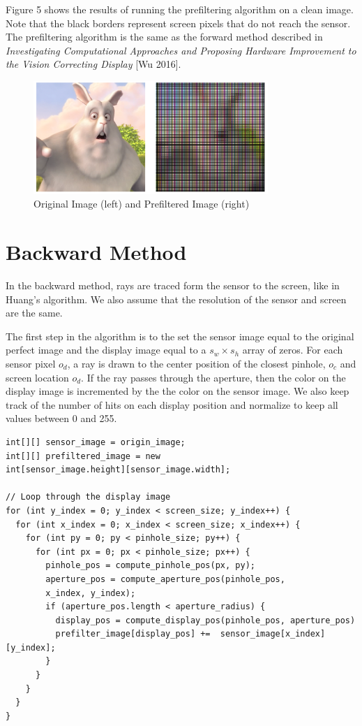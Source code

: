 Figure 5 shows the results of running the prefiltering algorithm on a clean image. Note that the black borders represent screen pixels that do not reach the sensor. The prefiltering algorithm is the same as the forward method described in \textit{Investigating Computational Approaches and Proposing Hardware Improvement to the Vision Correcting Display} [Wu 2016].

\begin{figure}[ht]
  \centering
  \includegraphics[width=3.5in]{chapters/chapter4/images/Original_Prefiltered.png}
  \caption{Original Image (left) and Prefiltered Image (right)}
  \label{fig:fr}
\end{figure}

\section{Backward Method}

In the backward method, rays are traced form the sensor to the screen, like in Huang's algorithm. We also assume that the resolution of the sensor and screen are the same. 

The first step in the algorithm is to the set the sensor image equal to the original perfect image and the display image equal to a $s_w \times s_h$ array of zeros. For each sensor pixel $o_d$, a ray is drawn to the center position of the closest pinhole, $o_c$ and screen location $o_d$. If the ray passes through the aperture, then the color on the display image is incremented by the the color on the sensor image. We also keep track of the number of hits on each display position and normalize to keep all values between 0 and 255.

\lstset {language=C++}
\begin{lstlisting}[frame=single, caption=Pseudocode For Prefiltering Algorithm]
int[][] sensor_image = origin_image;
int[][] prefiltered_image = new
int[sensor_image.height][sensor_image.width];

// Loop through the display image
for (int y_index = 0; y_index < screen_size; y_index++) {
  for (int x_index = 0; x_index < screen_size; x_index++) {
    for (int py = 0; py < pinhole_size; py++) {
      for (int px = 0; px < pinhole_size; px++) {
        pinhole_pos = compute_pinhole_pos(px, py);
        aperture_pos = compute_aperture_pos(pinhole_pos, 
        x_index, y_index);
        if (aperture_pos.length < aperture_radius) {
          display_pos = compute_display_pos(pinhole_pos, aperture_pos)
          prefilter_image[display_pos] +=  sensor_image[x_index][y_index];
        }
      }
    }
  }
}
\end{lstlisting}



